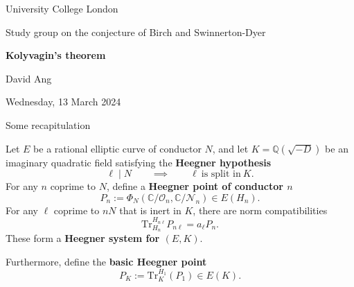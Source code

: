 \documentclass[10pt]{beamer}
\begin{document}
\begin{frame}

\begin{center}

{\scriptsize University College London}

\vspace{0.5cm}

{\small Study group on the conjecture of Birch and Swinnerton-Dyer}

\vspace{1cm}

\textbf{\large Kolyvagin's theorem}

\vspace{1cm}

David Ang

\vspace{0.5cm}

{\footnotesize Wednesday, 13 March 2024}

\end{center}

\end{frame}

\begin{frame}[t]{Some recapitulation}

Let $ E $ be a rational elliptic curve of conductor $ N $, and let $ K = \mathbb{Q}(\sqrt{-D}) $ be an imaginary quadratic field satisfying the \textbf{Heegner hypothesis}
$$ \ell \mid N \qquad \implies \qquad \ell \ \text{is split in} \ K. $$
For any $ n $ coprime to $ N $, define a \textbf{Heegner point of conductor $ n $}
$$ P_n := \Phi_N(\mathbb{C} / \mathcal{O}_n, \mathbb{C} / \mathcal{N}_n) \in E(H_n). $$
For any $ \ell $ coprime to $ nN $ that is inert in $ K $, there are norm compatibilities
$$ \mathrm{Tr}_{H_n}^{H_{n\ell}} P_{n\ell} = a_\ell P_n. $$
These form a \textbf{Heegner system for $ (E, K) $}.

\vspace{0.5cm} Furthermore, define the \textbf{basic Heegner point}
$$ P_K := \mathrm{Tr}_K^{H_1}(P_1) \in E(K). $$

\end{frame}
\end{document}
